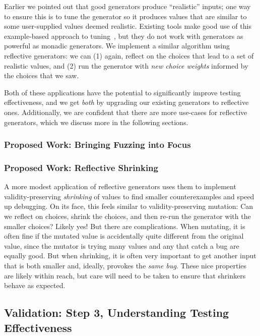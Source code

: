  Earlier we pointed out that good generators
produce ``realistic'' inputs; one way to ensure this is to tune the generator so
it produces values that are similar to some user-supplied values deemed
realistic. Existing tools make good use of this example-based approach to
tuning~\cite{soremekun2020inputs}, but they do not work with generators as
powerful as monadic generators. We implement a similar algorithm using
reflective generators: we can (1) again, reflect on the choices that lead to a
set of realistic values, and (2) run the generator with {\em new choice weights}
informed by the choices that we saw.

Both of these applications have the potential to significantly improve testing
effectiveness, and we get {\em both} by upgrading our existing generators to
reflective ones. Additionally, we are confident that there are more use-cases
for reflective generators, which we discuss more in the following sections.

\subsubsection{Proposed Work: Bringing Fuzzing into Focus}

\subsubsection{Proposed Work: Reflective Shrinking}
A more modest application of reflective generators uses them to implement
validity-preserving {\em shrinking} of values to find smaller counterexamples
and speed up debugging. On its face, this feels similar to validity-preserving
mutation: Can we reflect on choices, shrink the choices, and then re-run the
generator with the smaller choices? Likely yes! But there are complications.
When mutating, it is often fine if the mutated value is accidentally quite
different from the original value, since the mutator is trying many values and
any that catch a bug are equally good. But when shrinking, it is often very
important to get another input that is both smaller and, ideally, provokes the
{\em same bug}. These nice properties are likely within reach, but care will
need to be taken to ensure that shrinkers behave as expected.

\subsection{Validation: Step 3, Understanding Testing Effectiveness }

